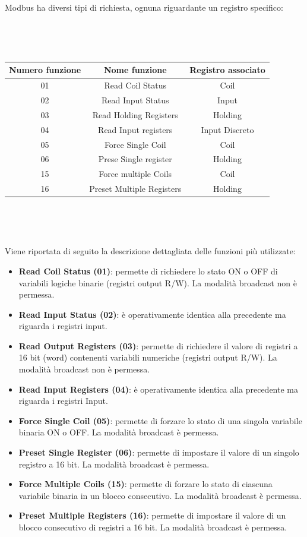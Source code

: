 \documentclass[a4paper,titlepage]{book}
\begin{document}
Modbus ha diversi tipi di richiesta, ognuna riguardante un registro specifico:

~

~

\begin{tabular}{|c  c  c|}
\hline
\multicolumn{1}{|c|}{\textbf {Numero funzione}} & \multicolumn{1}{c}{\textbf {Nome funzione}} & \multicolumn{1}{|c|}{\textbf {Registro associato}} \\
\hline
01 & Read Coil Status		&	Coil		\\
02 & Read Input Status		&	Input		\\
03 & Read Holding Registers	&	Holding		\\
04 & Read Input registers	&	Input Discreto	\\
05 & Force Single Coil		&	Coil		\\
06 & Prese Single register	&	Holding		\\
15 & Force multiple Coils	&	Coil		\\
16 & Preset Multiple Registers	&	Holding		\\
\hline
\end{tabular}

~

~

Viene riportata di seguito la descrizione dettagliata delle funzioni più utilizzate:

\begin{itemize}[noitemsep,topsep=15pt,parsep=10pt,partopsep=0pt]
\item \textbf{Read Coil Status (01)}: permette di richiedere lo stato ON o OFF di variabili logiche binarie (registri
output R/W).
La modalità broadcast non è permessa.
\item \textbf{Read Input Status (02)}: è operativamente identica alla precedente ma riguarda i registri input.
\item \textbf{Read Output Registers (03)}: permette di richiedere il valore di registri a 16 bit (word) contenenti variabili numeriche (registri output R/W). La modalità broadcast non è permessa.
\item \textbf{Read Input Registers (04)}: è operativamente identica alla precedente ma riguarda i registri Input.
\item \textbf{Force Single Coil (05)}: permette di forzare lo stato di una singola variabile binaria ON o OFF. La modalità broadcast è permessa.
\item \textbf{Preset Single Register (06)}: permette di impostare il valore di un singolo registro a 16 bit. La modalità broadcast è permessa.
\item \textbf{Force Multiple Coils (15)}: permette di forzare lo stato di ciascuna variabile binaria in un blocco consecutivo. La modalità broadcast è permessa.
\item \textbf{Preset Multiple Registers (16)}: permette di impostare il valore di un blocco consecutivo di registri a 16 bit. La modalità broadcast è permessa.

\end{itemize}
\end{document}
